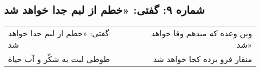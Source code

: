 \begin{center}
\section*{شماره ۹: گفتی: «خطم از لبم جدا خواهد شد}
\label{sec:009}
\begin{longtable}{l p{0.5cm} r}
گفتی: «خطم از لبم جدا خواهد شد
&&
وین وعده که میدهم وفا خواهد شد»
\\
طوطی لبت به شکّر و آب حیاة
&&
منقار فرو برده کجا خواهد شد
\\
\end{longtable}
\end{center}
